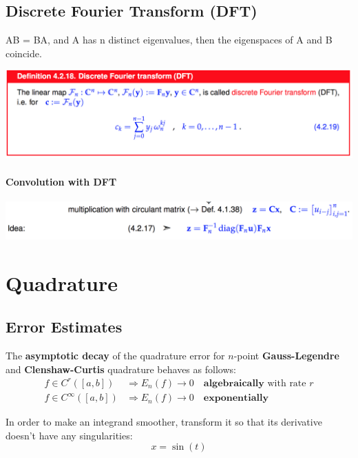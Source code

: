 \documentclass[12pt, a4paper]{article}
\begin{document}
\subsection{Discrete Fourier Transform (DFT)}
AB = BA, and A has n distinct eigenvalues, then the eigenspaces of A and B coincide.
\begin{center}
	\includegraphics[width=380pt]{dft.png}
\end{center}
\paragraph{Convolution with DFT}
\begin{center}
	\includegraphics[width=380pt]{convDFT.png}
\end{center}

\section{Quadrature}

\subsection{Error Estimates}

The \textbf{asymptotic decay} of the quadrature error for $n$-point \textbf{Gauss-Legendre} and \textbf{Clenshaw-Curtis} quadrature behaves as follows:
\begin{equation*}
\begin{split}
	f \in C^r([a,b]) & \Rightarrow E_n(f) \rightarrow 0 \quad\textbf{algebraically}\text{ with rate $r$} \\
	f \in C^\infty([a,b]) & \Rightarrow E_n(f) \rightarrow 0 \quad\textbf{exponentially}
\end{split}
\end{equation*}

In order to make an integrand smoother, transform it so that its derivative doesn't have any singularities:
\begin{equation*}
	x = \sin(t)
\end{equation*}
\end{document}
